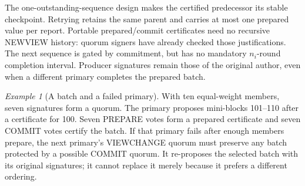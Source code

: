 \documentclass[11pt,a4paper,onecolumn]{article}
\theoremstyle{remark}\newtheorem{example}[definition]{Example}
\begin{document}
The one-outstanding-sequence design makes the certified predecessor its stable
checkpoint. Retrying retains the same parent and carries at most one prepared
value per report. Portable prepared/commit certificates need no recursive
NEWVIEW history: quorum signers have already checked those justifications.
The next sequence is gated by commitment, but has no mandatory $n_i$-round
completion interval. Producer signatures remain those of the original author,
even when a different primary completes the prepared batch.

\begin{example}[A batch and a failed primary]
With ten equal-weight members, seven signatures form a quorum. The primary
proposes mini-blocks 101--110 after a certificate for 100. Seven PREPARE votes
form a prepared certificate and seven COMMIT votes certify the batch. If that
primary fails after enough members prepare, the next primary's VIEWCHANGE
quorum must preserve any batch protected by a possible COMMIT quorum. It
re-proposes the selected batch with its original signatures; it cannot replace
it merely because it prefers a different ordering.
\end{example}

\end{document}
